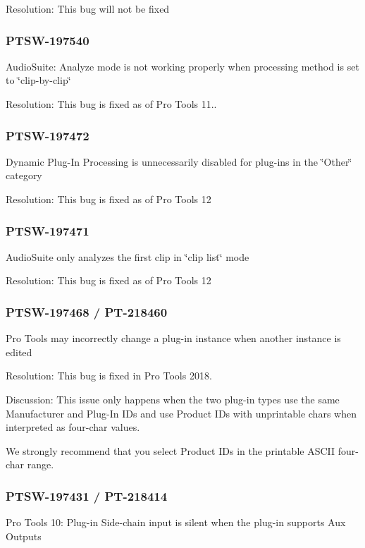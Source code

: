 Resolution\+: This bug will not be fixed\hypertarget{a00374_PTSW-197540}{}\subsubsection{P\+T\+S\+W-\/197540}\label{a00374_PTSW-197540}
Audio\+Suite\+: Analyze mode is not working properly when processing method is set to \char`\"{}clip-\/by-\/clip\char`\"{}

Resolution\+: This bug is fixed as of Pro Tools 11..\hypertarget{a00374_PTSW-197472}{}\subsubsection{P\+T\+S\+W-\/197472}\label{a00374_PTSW-197472}
Dynamic Plug-\/\+In Processing is unnecessarily disabled for plug-\/ins in the \char`\"{}\+Other\char`\"{} category

Resolution\+: This bug is fixed as of Pro Tools 12\hypertarget{a00374_PTSW-197471}{}\subsubsection{P\+T\+S\+W-\/197471}\label{a00374_PTSW-197471}
Audio\+Suite only analyzes the first clip in \char`\"{}clip list\char`\"{} mode

Resolution\+: This bug is fixed as of Pro Tools 12\hypertarget{a00374_PTSW-197468}{}\subsubsection{P\+T\+S\+W-\/197468 / P\+T-\/218460}\label{a00374_PTSW-197468}
Pro Tools may incorrectly change a plug-\/in instance when another instance is edited

Resolution\+: This bug is fixed in Pro Tools 2018.

Discussion\+: This issue only happens when the two plug-\/in types use the same Manufacturer and Plug-\/\+In I\+Ds and use Product I\+Ds with unprintable chars when interpreted as four-\/char values.

We strongly recommend that you select Product I\+Ds in the printable A\+S\+C\+I\+I four-\/char range.\hypertarget{a00374_PTSW-197431}{}\subsubsection{P\+T\+S\+W-\/197431 / P\+T-\/218414}\label{a00374_PTSW-197431}
Pro Tools 10\+: Plug-\/in Side-\/chain input is silent when the plug-\/in supports Aux Outputs

